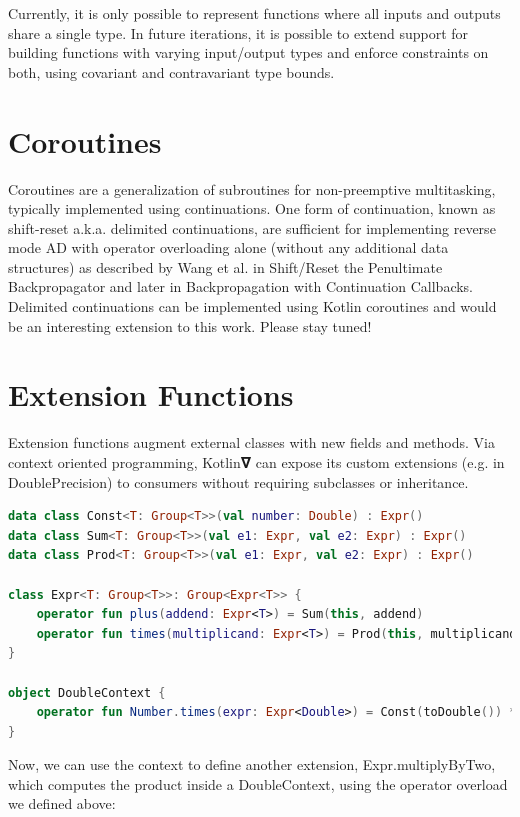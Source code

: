 \documentclass[12pt,initial,twoside,maitrise]{dms}
\numberwithin{equation}{section}
\numberwithin{table}{chapter}
\numberwithin{figure}{chapter}
\begin{document}
Currently, it is only possible to represent functions where all inputs and outputs share a single type. In future iterations, it is possible to extend support for building functions with varying input/output types and enforce constraints on both, using covariant and contravariant type bounds.

\section{Coroutines}

Coroutines are a generalization of subroutines for non-preemptive multitasking, typically implemented using continuations. One form of continuation, known as shift-reset a.k.a. delimited continuations, are sufficient for implementing reverse mode AD with operator overloading alone (without any additional data structures) as described by Wang et al. in Shift/Reset the Penultimate Backpropagator and later in Backpropagation with Continuation Callbacks. Delimited continuations can be implemented using Kotlin coroutines and would be an interesting extension to this work. Please stay tuned!

\section{Extension Functions}

Extension functions augment external classes with new fields and methods. Via context oriented programming, Kotlin𝛁 can expose its custom extensions (e.g. in DoublePrecision) to consumers without requiring subclasses or inheritance.

\begin{lstlisting}[caption={Simple code listing.}, language=Kotlin]
data class Const<T: Group<T>>(val number: Double) : Expr()
data class Sum<T: Group<T>>(val e1: Expr, val e2: Expr) : Expr()
data class Prod<T: Group<T>>(val e1: Expr, val e2: Expr) : Expr()

class Expr<T: Group<T>>: Group<Expr<T>> {
    operator fun plus(addend: Expr<T>) = Sum(this, addend)
    operator fun times(multiplicand: Expr<T>) = Prod(this, multiplicand)
}

object DoubleContext {
    operator fun Number.times(expr: Expr<Double>) = Const(toDouble()) * expr
}
\end{lstlisting}

Now, we can use the context to define another extension, Expr.multiplyByTwo, which computes the product inside a DoubleContext, using the operator overload we defined above:
\end{document}
